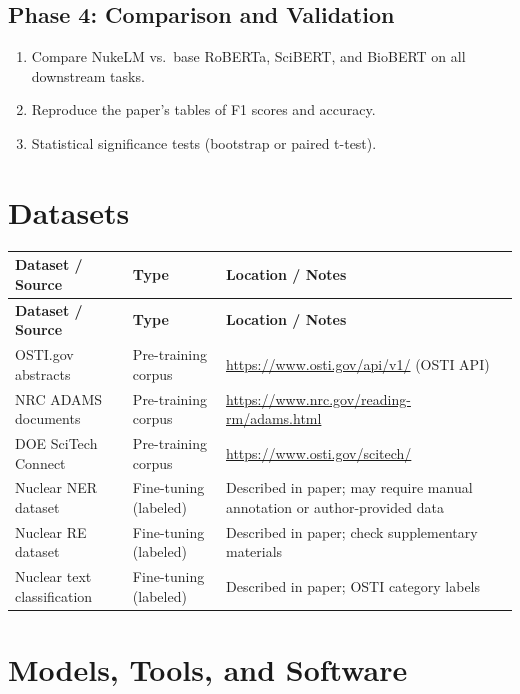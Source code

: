 \documentclass[11pt,a4paper]{article}
\begin{document}
\subsection{Phase 4: Comparison and Validation}
\begin{enumerate}[label=\textbf{4.\arabic*}]
  \item Compare NukeLM vs.\ base RoBERTa, SciBERT, and BioBERT on all downstream tasks.
  \item Reproduce the paper's tables of F1 scores and accuracy.
  \item Statistical significance tests (bootstrap or paired t-test).
\end{enumerate}

\section{Datasets}

\begin{longtable}{p{4.5cm} p{3.5cm} p{6cm}}
\toprule
\textbf{Dataset / Source} & \textbf{Type} & \textbf{Location / Notes} \\
\midrule
\endfirsthead
\toprule
\textbf{Dataset / Source} & \textbf{Type} & \textbf{Location / Notes} \\
\midrule
\endhead
OSTI.gov abstracts & Pre-training corpus & \url{https://www.osti.gov/api/v1/} (OSTI API) \\
\midrule
NRC ADAMS documents & Pre-training corpus & \url{https://www.nrc.gov/reading-rm/adams.html} \\
\midrule
DOE SciTech Connect & Pre-training corpus & \url{https://www.osti.gov/scitech/} \\
\midrule
Nuclear NER dataset & Fine-tuning (labeled) & Described in paper; may require manual annotation or author-provided data \\
\midrule
Nuclear RE dataset & Fine-tuning (labeled) & Described in paper; check supplementary materials \\
\midrule
Nuclear text classification & Fine-tuning (labeled) & Described in paper; OSTI category labels \\
\bottomrule
\end{longtable}

\section{Models, Tools, and Software}
\end{document}
